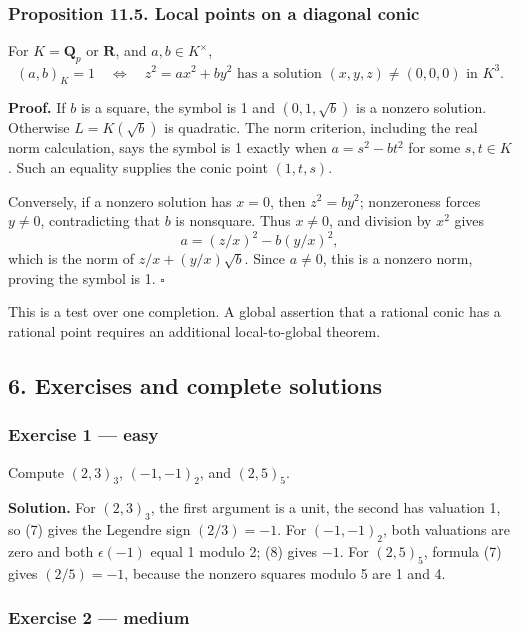 \documentclass[11pt,a4paper]{article}
\begin{document}
\subsubsection{Proposition 11.5. Local points on a diagonal
conic}\label{proposition-11.5.-local-points-on-a-diagonal-conic}

For \(K=\mathbf Q_p\) or \(\mathbf R\), and \(a,b\in K^\times\), \[
(a,b)_K=1
\quad\Longleftrightarrow\quad
z^2=ax^2+by^2
\text{ has a solution }(x,y,z)\ne(0,0,0)\text{ in }K^3.
\tag{12}
\]

\textbf{Proof.} If \(b\) is a square, the symbol is 1 and
\((0,1,\sqrt b)\) is a nonzero solution. Otherwise \(L=K(\sqrt b)\) is
quadratic. The norm criterion, including the real norm calculation, says
the symbol is 1 exactly when \(a=s^2-bt^2\) for some \(s,t\in K\). Such
an equality supplies the conic point \((1,t,s)\).

Conversely, if a nonzero solution has \(x=0\), then \(z^2=by^2\);
nonzeroness forces \(y\ne0\), contradicting that \(b\) is nonsquare.
Thus \(x\ne0\), and division by \(x^2\) gives \[
a=(z/x)^2-b(y/x)^2,
\] which is the norm of \(z/x+(y/x)\sqrt b\). Since \(a\ne0\), this is a
nonzero norm, proving the symbol is 1. \(\square\)

This is a test over one completion. A global assertion that a rational
conic has a rational point requires an additional local-to-global
theorem.

\subsection{6. Exercises and complete
solutions}\label{exercises-and-complete-solutions}

\subsubsection{Exercise 1 --- easy}\label{exercise-1-easy}

Compute \((2,3)_3\), \((-1,-1)_2\), and \((2,5)_5\).

\textbf{Solution.} For \((2,3)_3\), the first argument is a unit, the
second has valuation 1, so (7) gives the Legendre sign \((2/3)=-1\). For
\((-1,-1)_2\), both valuations are zero and both \(\epsilon(-1)\) equal
1 modulo 2; (8) gives \(-1\). For \((2,5)_5\), formula (7) gives
\((2/5)=-1\), because the nonzero squares modulo 5 are 1 and 4.

\subsubsection{Exercise 2 --- medium}\label{exercise-2-medium}
\end{document}
